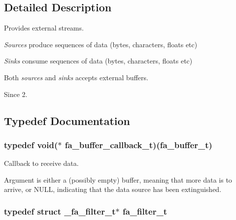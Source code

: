 \subsection{Detailed Description}
Provides external streams. 
\begin{DoxyItemize}
\item {\itshape Sources} produce sequences of data (bytes, characters, floats etc)
\item {\itshape Sinks} consume sequences of data (bytes, characters, floats etc)
\item Both {\itshape sources} and {\itshape sinks} accepts external buffers.
\end{DoxyItemize}

\begin{DoxySince}{Since}
2. 
\end{DoxySince}


\subsection{Typedef Documentation}
\hypertarget{group___fa_streams_ga9f9c29b1d06e16f886e1458cbf3d827f}{
\subsubsection[{fa\-\_\-buffer\-\_\-callback\-\_\-t}]{\setlength{\rightskip}{0pt plus 5cm}typedef void($\ast$  fa\-\_\-buffer\-\_\-callback\-\_\-t)({\bf fa\-\_\-buffer\-\_\-t})}}\label{group___fa_streams_ga9f9c29b1d06e16f886e1458cbf3d827f}


Callback to receive data. 

Argument is either a (possibly empty) buffer, meaning that more data is to arrive, or {\ttfamily N\-U\-L\-L}, indicating that the data source has been extinguished. \hypertarget{group___fa_streams_ga5d565d001005952a789cb9c7b3404f7e}{
\subsubsection[{fa\-\_\-filter\-\_\-t}]{\setlength{\rightskip}{0pt plus 5cm}typedef struct \-\_\-fa\-\_\-filter\-\_\-t$\ast$ {\bf fa\-\_\-filter\-\_\-t}}}\label{group___fa_streams_ga5d565d001005952a789cb9c7b3404f7e}


